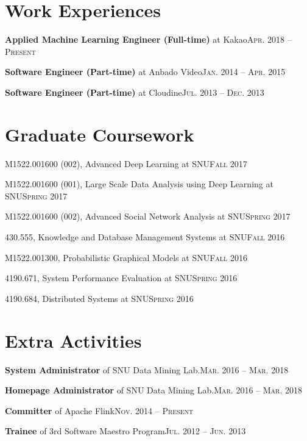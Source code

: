 \documentclass[11pt,a4paper]{article}
\renewenvironment{itemize}{
  \begin{list}{}{
    \setlength{\leftmargin}{1.5em}
    \setlength{\itemsep}{0.5em}
    \setlength{\parskip}{0pt}
    \setlength{\parsep}{0.25em}
  }
}{
  \end{list}
}
\begin{document}
\section*{Work Experiences}
\begin{itemize}
  \setlength\itemsep{0.1em}
  \item \textbf{Applied Machine Learning Engineer (Full-time)} at Kakao\hfill\textsc{Apr. 2018 -- Present}
  \item \textbf{Software Engineer (Part-time)} at Anbado Video\hfill\textsc{Jan. 2014 -- Apr. 2015}
  \item \textbf{Software Engineer (Part-time)} at Cloudine\hfill\textsc{Jul. 2013 -- Dec. 2013}
\end{itemize}

\section*{Graduate Coursework}
\begin{itemize}
  \setlength\itemsep{0.1em}
  \item M1522.001600 (002), Advanced Deep Learning at SNU\hfill\textsc{Fall 2017}
  \item M1522.001600 (001), Large Scale Data Analysis using Deep Learning at SNU\hfill\textsc{Spring 2017}
  \item M1522.001600 (002), Advanced Social Network Analysis at SNU\hfill\textsc{Spring 2017}
  \item 430.555, Knowledge and Database Management Systems at SNU\hfill\textsc{Fall 2016}
  \item M1522.001300, Probabilistic Graphical Models at SNU\hfill\textsc{Fall 2016}
  \item 4190.671, System Performance Evaluation at SNU\hfill\textsc{Spring 2016}
  \item 4190.684, Distributed Systems at SNU\hfill\textsc{Spring 2016}
\end{itemize}

\section*{Extra Activities}
\begin{itemize}
  \setlength\itemsep{0.1em}
  \item \textbf{System Administrator} of SNU Data Mining Lab.\hfill\textsc{Mar. 2016 -- Mar. 2018}
  \item \textbf{Homepage Administrator} of SNU Data Mining Lab.\hfill\textsc{Mar. 2016 -- Mar. 2018}
  \item \textbf{Committer} of Apache Flink\hfill\textsc{Nov. 2014 -- Present}
  \item \textbf{Trainee} of 3rd Software Maestro Program\hfill\textsc{Jul. 2012 -- Jun. 2013}
\end{itemize}
\end{document}
